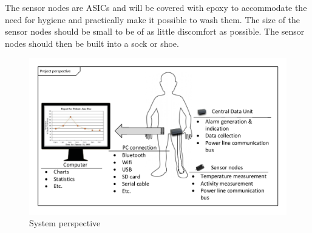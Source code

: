 The sensor nodes are ASICs and will be covered with epoxy to accommodate the need for hygiene and practically make it possible to wash them. The size of the sensor nodes should be small to be of as little discomfort as possible. The sensor nodes should then be built into a sock or shoe.
\begin{figure}[H]
	\centering
	\includegraphics[width=.9\textwidth]{billeder/6Systemdescription/fullsystem_vector}
	\caption{System perspective}
	\label{fig:full_system}
\end{figure}
